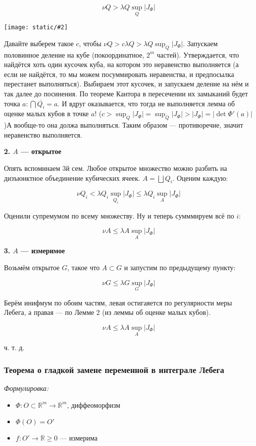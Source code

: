 \documentclass{article}
\def\images#1#2{\begin{center}\texttt{[image: static/\#2]}\end{center}}
\begin{document}
\[\nu Q > \lambda Q \sup_{Q} |J_{\Phi}|\]

\images{0.3}{diff_del.jpg}

Давайте выберем такое $c$, чтобы $\nu Q > c \lambda Q > \lambda Q \sup_{Q} |J_{\Phi}|$. Запускаем половинное деление на кубе (покоординатное, $2^m$ частей). Утверждается, что найдётся хоть один кусочек куба, на котором это неравенство выполняется (а если не найдётся, то мы можем посуммировать неравенства, и предпосылка перестанет выполняться). Выбираем этот кусочек, и запускаем деление на нём и так далее до посинения. По теореме Кантора в пересечении их замыканий будет точка $a: \bigcap \overline{Q_i} = a$. И вдруг оказывается, что тогда не выполняется лемма об оценке малых кубов в точке $a$! ($c > \sup_{Q} |J_{\Phi}| = \sup_{\overline{Q}} |J_{\Phi}| > |J_{\Phi}| = |\det \Phi'(a)|$)А вообще-то она должа выполняться. Таким образом --- противоречие, значит неравенство выполняется.

\textbf{2. $A$ --- открытое}

Опять вспоминаем 3й сем. Любое открытое множество можно разбить на дизъюнктное объединение кубических ячеек. $A = \bigsqcup Q_i$. Оценим каждую:

\[\nu Q_i < \lambda Q_i \sup_{Q_i} |J_{\Phi}| \le \lambda Q_i \sup_{A} |J_{\Phi}|\]

Оценили супремумом по всему множеству. Ну и теперь сумммируем всё по $i$:

\[\nu A \le \lambda A \sup_{A} |J_{\Phi}|\]

\textbf{3. $A$ --- измеримое}

Возьмём открытое $G$, такое что $A \subset G$ и запустим по предыдущему пункту:

\[\nu G \le \lambda G \sup_{G} |J_{\Phi}|\]

Берём инифмум по обоим частям, левая остигаяется по регулярности меры Лебега, а правая --- по Лемме 2 (из леммы об оценке малых кубов).

\[\nu A \le \lambda A \sup_{A} |J_{\Phi}|\]

ч. т. д. 

\subsubsection{Теорема о гладкой замене переменной в интеграле Лебега}
\textit{Формулировка:}

\begin{itemize}
    \item $\Phi: O \subset \mathbb{R}^{m} \rightarrow \mathbb{R}^{m}$, диффеоморфизм
    \item $\Phi(O) = O'$
    \item $f: O' \rightarrow \mathbb{R} \ge 0$ --- измерима
\end{itemize}
\end{document}
